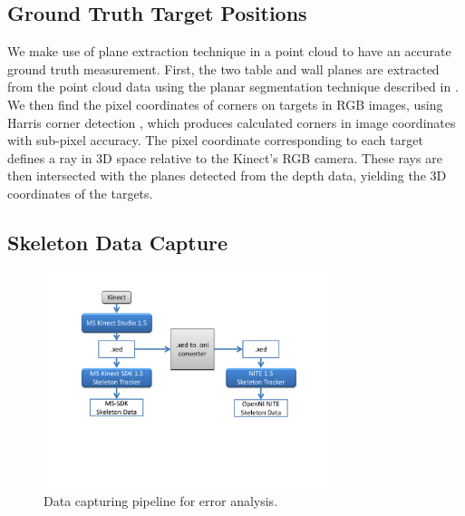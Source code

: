 \documentclass[12pt]{gatech-thesis}
\begin{document}
\subsection{Ground Truth Target Positions}
\label{sec:ground_truth_points}

We make use of plane extraction technique in a point cloud to have an accurate ground truth measurement. First, the two table and wall planes are extracted from the point cloud data using the planar segmentation technique described in \cite{trevor2013segmentation}. We then find the pixel coordinates of corners on targets in RGB images, using Harris corner detection \cite{harris1988combined}, which produces calculated corners in image coordinates with sub-pixel accuracy. The pixel coordinate corresponding to each target defines a ray in 3D space relative to the Kinect's RGB camera. These rays are then intersected with the planes detected from the depth data, yielding the 3D coordinates of the targets.



\subsection{Skeleton Data Capture}
\label{sec:pointing_skeleton_data_capture}

\begin{figure}[ht!]
\centering
\includegraphics[width=0.75\textwidth]{pics/xedoni_2_cropped}
\caption{Data capturing pipeline for error analysis.}
\label{fig:xedoni}
\end{figure}
\end{document}
